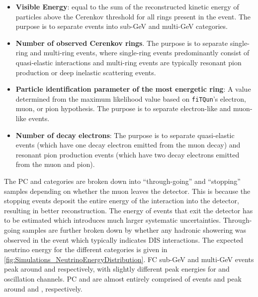 \begin{itemize}
    \item \textbf{Visible Energy}: equal to the sum of the reconstructed kinetic energy of particles above the Cerenkov threshold for all rings present in the event. The purpose is to separate events into sub-GeV and multi-GeV categories. 
    \item \textbf{Number of observed Cerenkov rings}. The purpose is to separate single-ring and multi-ring events, where single-ring events predominantly consist of quasi-elastic interactions and multi-ring events are typically resonant pion production or deep inelastic scattering events.
    \item \textbf{Particle identification parameter of the most energetic ring}: A value determined from the maximum likelihood value based on \texttt{fiTQun}'s electron, muon, or pion hypothesis. The purpose is to separate electron-like and muon-like events.
    \item \textbf{Number of decay electrons}: The purpose is to separate quasi-elastic events (which have one decay electron emitted from the muon decay) and resonant pion production events (which have two decay electrons emitted from the muon and pion).
\end{itemize}

The PC and  categories are broken down into ``through-going'' and ``stopping'' samples depending on whether the muon leaves the detector. This is because the  stopping events deposit the entire energy of the interaction into the detector, resulting in better reconstruction. The energy of events that exit the detector has to be estimated which introduces much larger systematic uncertainties. Through-going  samples are further broken down by whether any hadronic showering was observed in the event which typically indicates DIS interactions. The expected neutrino energy for the different categories is given in \autoref{fig:Simulations_NeutrinoEnergyDistribution}. FC sub-GeV and multi-GeV events peak around  and  respectively, with slightly different peak energies for  and  oscillation channels. PC and  are almost entirely comprised of \quickmath{\nu_{\mu}} events and peak around  and , respectively.

